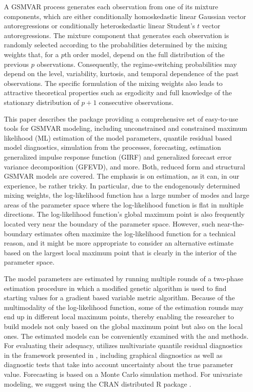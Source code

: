 \documentclass[nojss]{jss} %
\begin{document}
A GSMVAR process generates each observation from one of its mixture components, which are either conditionally homoskedastic linear Gaussian vector autoregressions or conditionally heteroskedastic linear Student's $t$ vector autoregressions. The mixture component that generates each observation is randomly selected according to the probabilities determined by the mixing weights that, for a $p$th order model, depend on the full distribution of the previous $p$ observations. Consequently, the regime-switching probabilities may depend on the level, variability, kurtosis, and temporal dependence of the past observations. The specific formulation of the mixing weights also leads to attractive theoretical properties such as ergodicity and full knowledge of the stationary distribution of $p+1$ consecutive observations.

This paper describes the  package  providing a comprehensive set of easy-to-use tools for GSMVAR modeling, including unconstrained and constrained maximum likelihood (ML) estimation of the model parameters, quantile residual based model diagnostics, simulation from the processes, forecasting, estimation generalized impulse response function (GIRF) and generalized forecast error variance decomposition (GFEVD), and more. Both, reduced form and structural GSMVAR models are covered. The emphasis is on estimation, as it can, in our experience, be rather tricky. In particular, due to the endogenously determined mixing weights, the log-likelihood function has a large number of modes and large areas of the parameter space where the log-likelihood function is flat in multiple directions. The log-likelihood function's global maximum point is also frequently located very near the boundary of the parameter space. However, such near-the-boundary estimates often maximize the log-likelihood function for a technical reason, and it might be more appropriate to consider an alternative estimate based on the largest local maximum point that is clearly in the interior of the parameter space.

The model parameters are estimated by running multiple rounds of a two-phase estimation procedure in which a modified genetic algorithm is used to find starting values for a gradient based variable metric algorithm. Because of the multimodality of the log-likelihood function, some of the estimation rounds may end up in different local maximum points, thereby enabling the researcher to build models not only based on the global maximum point but also on the local ones. The estimated models can be conveniently examined with the  and  methods. For evaluating their adequacy,  utilizes multivariate quantile residual diagnostics in the framework presented in \cite{Kalliovirta+Saikkonen:2010}, including graphical diagnostics as well as diagnostic tests that take into account uncertainty about the true parameter value. Forecasting is based on a Monte Carlo simulation method. For univariate modeling, we suggest using the CRAN distributed R package  \citep{uGMAR}.
\end{document}

